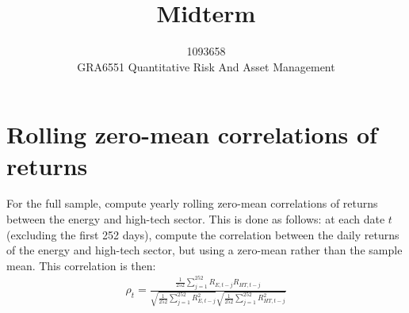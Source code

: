 \documentclass[10pt]{article}
\begin{document}
 
\title{Midterm}
\author{1093658\\
GRA6551 Quantitative Risk And Asset Management}
\maketitle

\section{Rolling zero-mean correlations of returns}
For the full sample, compute yearly rolling zero-mean correlations of returns between the energy and high-tech sector. This is done as follows: at each date $t $ (excluding the first 252 days), compute the correlation between the daily returns of the energy and high-tech sector, but using a zero-mean rather than the sample mean. This correlation is then: 
\begin{gather*}
    \rho_t = \frac{\frac{1}{252}\sum_{j = 1}^{252}R_{E, t - j}R_{HT, t - j}}{\sqrt{\frac{1}{252}\sum_{j = 1}^{252}R^2_{E, t - j}}\sqrt{\frac{1}{252}\sum_{j = 1}^{252}R^2_{HT, t - j}}}
\end{gather*}
\end{document}
